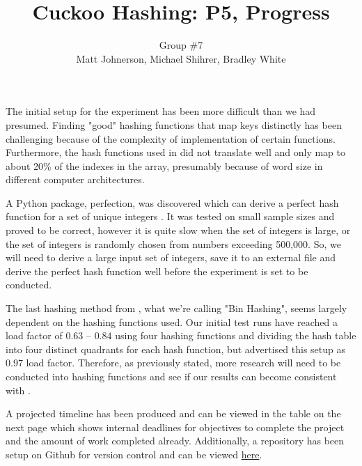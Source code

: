 \documentclass[11pt]{article}
\title{Cuckoo Hashing: P5, Progress}
\author{Group \#7 \\ 
\small{Matt Johnerson, Michael Shihrer, Bradley White}}
\begin{document}
\maketitle

The initial setup for the experiment has been more difficult than we had presumed. Finding "good" hashing functions that map keys distinctly has been challenging because of the complexity of implementation of certain functions. Furthermore, the hash functions used in \cite{pagh} did not translate well and only map to about 20\% of the indexes in the array, presumably because of word size in different computer architectures. \par

A Python package, perfection, was discovered which can derive a perfect hash function for a set of unique integers \cite{perfect}. It was tested on small sample sizes and proved to be correct, however it is quite slow when the set of integers is large, or the set of integers is randomly chosen from numbers exceeding 500,000. So, we will need to derive a large input set of integers, save it to an external file and derive the perfect hash function well before the experiment is set to be conducted. \par

The last hashing method from \cite{erlingsson}, what we're calling "Bin Hashing", seems largely dependent on the hashing functions used. Our initial test runs have reached a load factor of $0.63$ -- $0.84$ using four hashing functions and dividing the hash table into four distinct quadrants for each hash function, but \cite{erlingsson} advertised this setup as $0.97$ load factor. Therefore, as previously stated, more research will need to be conducted into hashing functions and see if our results can become consistent with \cite{erlingsson}.\par

A projected timeline has been produced and can be viewed in the table on the next page which shows internal deadlines for objectives to complete the project and the amount of work completed already. Additionally, a repository has been setup on Github for version control and can be viewed \href{https://github.com/Ikuni17/432-Project}{here}.
\end{document}
